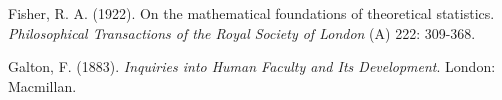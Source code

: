 \documentclass[12pt]{article}
\begin{document}
\begin{thebibliography}{99}

 Fisher, R. A. (1922). On the mathematical foundations of
theoretical statistics. {\it Philosophical Transactions of the Royal
Society of London} (A) 222: 309-368.

Galton, F. (1883). {\it Inquiries into Human Faculty and Its
Development}. London: Macmillan.

\end{thebibliography}
\end{document}

